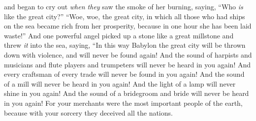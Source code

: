 \begin{biblechapter}
\verse and began to cry out \textit{when they} saw the smoke of her burning, saying, “Who \textit{is} like the great city?”
\verse “Woe, woe, the great city, 
in which all those who had ships on the sea 
became rich from her prosperity, 
because in one hour she has been laid waste!”
\verse And one powerful angel picked up a stone like a great millstone and threw \textit{it} into the sea, saying,
\verse “In this way Babylon the great city will be thrown down with violence, 
and will never be found again!
\verse And the sound of harpists and musicians and flute players and trumpeters 
will never be heard in you again! 
And every craftsman of every trade 
will never be found in you again! 
And the sound of a mill 
will never be heard in you again!
\verse And the light of a lamp 
will never shine in you again! 
And the sound of a bridegroom and bride 
will never be heard in you again! 
For your merchants were the most important people of the earth, 
because with your sorcery they deceived all the nations.
\end{biblechapter}

